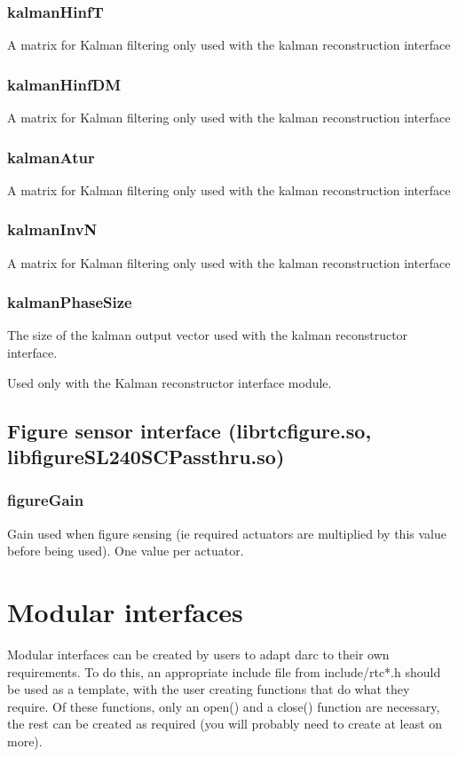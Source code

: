 \documentclass[a4,10pt]{article}
\begin{document}
\subsubsection{kalmanHinfT}
A matrix for Kalman filtering only used with the kalman reconstruction interface

\subsubsection{kalmanHinfDM}
A matrix for Kalman filtering only used with the kalman reconstruction interface

\subsubsection{kalmanAtur}
A matrix for Kalman filtering only used with the kalman reconstruction interface

\subsubsection{kalmanInvN}
A matrix for Kalman filtering only used with the kalman reconstruction interface

\subsubsection{kalmanPhaseSize}
The size of the kalman output vector used with the kalman
reconstructor interface.

Used only with the Kalman reconstructor interface module.

\subsection{Figure sensor interface (librtcfigure.so, libfigureSL240SCPassthru.so)}
\subsubsection{figureGain}
Gain used when figure sensing (ie required actuators are multiplied by
this value before being used).  One value per actuator.



\section{Modular interfaces}
Modular interfaces can be created by users to adapt darc to their own
requirements.  To do this, an appropriate include file from
include/rtc*.h should be used as a template, with the user creating
functions that do what they require.  Of these functions, only an
open() and a close() function are necessary, the rest can be created
as required (you will probably need to create at least on more).
\end{document}
